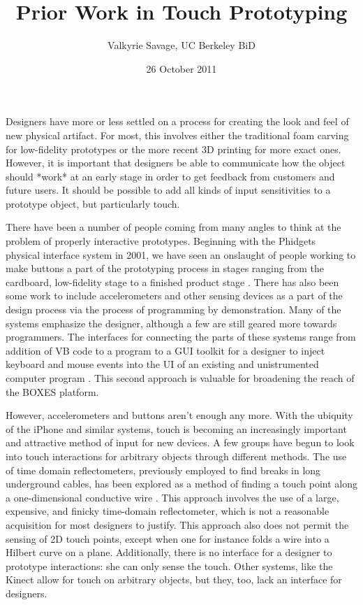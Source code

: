 \documentclass[11pt]{article}
\begin{document}
\title{Prior Work in Touch Prototyping}
\author{Valkyrie Savage, UC Berkeley BiD}
\date{26 October 2011}
\maketitle

Designers have more or less settled on a process for creating the look and feel of new physical artifact.  For most, this involves either the traditional foam carving for low-fidelity prototypes or the more recent 3D printing for more exact ones.  However, it is important that designers be able to communicate how the object should *work* at an early stage in order to get feedback from customers and future users.  It should be possible to add all kinds of input sensitivities to a prototype object, but particularly touch.

There have been a number of people coming from many angles to think at the problem of properly interactive prototypes.  Beginning with the Phidgets ~\cite{PHIDGETS} physical interface system in 2001, we have seen an onslaught of people working to make buttons \cite{CALDER}\cite{ISTUFF}\cite{BOXES}\cite{SMART-ITS}\cite{BOXES}\cite{HUDSON02} a part of the prototyping process in stages ranging from the cardboard, low-fidelity stage \cite{BOXES} to a finished product stage \cite{ISTUFF}.  There has also been some work to include accelerometers \cite{EXEMPLAR} and other sensing devices as a part of the design process via the process of programming by demonstration.  Many of the systems emphasize the designer, although a few \cite{ISTUFF}\cite{SMART-ITS} are still geared more towards programmers.  The interfaces for connecting the parts of these systems range from addition of VB code to a program \cite{PHIDGETS} to a GUI toolkit for a designer to inject keyboard and mouse events into the UI of an existing and unistrumented computer program \cite{BOXES}.  This second approach is valuable for broadening the reach of the BOXES platform.

However, accelerometers and buttons aren't enough any more.  With the ubiquity of the iPhone and similar systems, touch is becoming an increasingly important and attractive method of input for new devices.  A few groups have begun to look into touch interactions for arbitrary objects through different methods.  The use of time domain reflectometers, previously employed to find breaks in long underground cables, has been explored as a method of finding a touch point along a one-dimensional conductive wire \cite{TDR}.  This approach involves the use of a large, expensive, and finicky time-domain reflectometer, which is not a reasonable acquisition for most designers to justify.  This approach also does not permit the sensing of 2D touch points, except when one for instance folds a wire into a Hilbert curve on a plane.  Additionally, there is no interface for a designer to prototype interactions: she can only sense the touch.  Other systems, like the Kinect \cite{KINECT} allow for touch on arbitrary objects, but they, too, lack an interface for designers.
\end{document}
